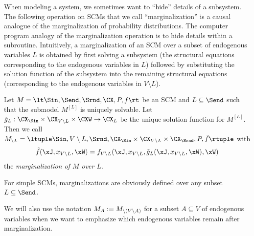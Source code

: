 When modeling a system, we sometimes want to ``hide'' details of a subsystem. The following operation
on SCMs that we call ``marginalization'' is a causal analogue of the marginalization of probability distributions.
The computer program analogy of the marginalization operation is to hide details within a subroutine.
Intuitively, a marginalization of an SCM over a subset of endogenous variables $L$ is obtained by first 
solving a subsystem (the structural equations
corresponding to the endogenous variables in $L$) followed by substituting the solution function of the 
subsystem into the remaining structural equations
(corresponding to the endogenous variables in $V\setminus L$).
\begin{Def}\label{def:scm_marginalization}
  Let $M = \lt \Sin, \Send, \Srnd, \CX, P, f \rt$ be an SCM and $L \subseteq \Send$ such that
  the submodel $M^{[L]}$ is uniquely solvable.
  Let $\tilde{g}_L : \CX_{\Sin} \times \CX_{V \sm L} \times \CXW \to \CX_L$
  be the unique solution function for $M^{[L]}$.
  Then we call $M_{\setminus L} = \ltuple \Sin, V \sm L, \Srnd, \CX_{\Sin} \times \CX_{V \sm L} \times \CX_{\Srnd}, P, \tilde{f} \rtuple$ with
  $$\tilde{f}(\xJ,x_{V \sm L},\xW) = f_{V \sm L}(\xJ,x_{V \sm L},\tilde{g}_L(\xJ,x_{V \sm L},\xW),\xW)$$
  the \emph{marginalization of $M$ over $L$}.
\end{Def}
For simple SCMs, marginalizations are obviously defined over any subset $L \subseteq \Send$.
\begin{Not}\label{not:scm_marginalization}
  We will also use the notation $M_A := M_{\setminus (V \setminus A)}$ for a subset $A \subseteq V$ of endogenous variables
  when we want to emphasize which endogenous variables remain after marginalization.
\end{Not}


